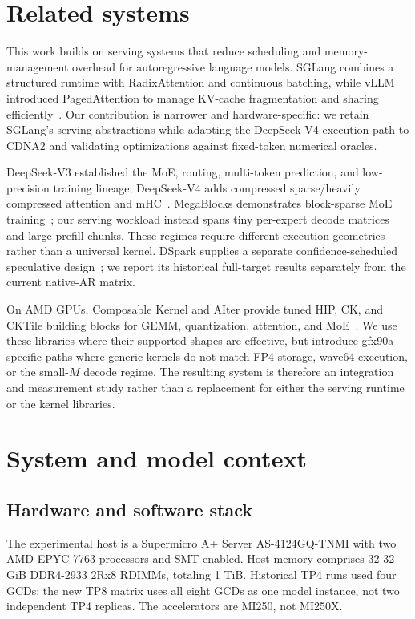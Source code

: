 \documentclass[sigplan,10pt]{acmart}
\begin{document}
\section{Related systems}

This work builds on serving systems that reduce scheduling and memory-management overhead for autoregressive language models. SGLang combines a structured runtime with RadixAttention and continuous batching, while vLLM introduced PagedAttention to manage KV-cache fragmentation and sharing efficiently~\cite{sglang,vllm}. Our contribution is narrower and hardware-specific: we retain SGLang's serving abstractions while adapting the DeepSeek-V4 execution path to CDNA2 and validating optimizations against fixed-token numerical oracles.

DeepSeek-V3 established the MoE, routing, multi-token prediction, and low-precision training lineage; DeepSeek-V4 adds compressed sparse/heavily compressed attention and mHC~\cite{dsv3,dsv4report}. MegaBlocks demonstrates block-sparse MoE training~\cite{megablocks}; our serving workload instead spans tiny per-expert decode matrices and large prefill chunks. These regimes require different execution geometries rather than a universal kernel. DSpark supplies a separate confidence-scheduled speculative design~\cite{dspark}; we report its historical full-target results separately from the current native-AR matrix.

On AMD GPUs, Composable Kernel and AIter provide tuned HIP, CK, and CKTile building blocks for GEMM, quantization, attention, and MoE~\cite{ck,aiter}. We use these libraries where their supported shapes are effective, but introduce gfx90a-specific paths where generic kernels do not match FP4 storage, wave64 execution, or the small-$M$ decode regime. The resulting system is therefore an integration and measurement study rather than a replacement for either the serving runtime or the kernel libraries.

\section{System and model context}

\subsection{Hardware and software stack}

The experimental host is a Supermicro A+ Server AS-4124GQ-TNMI with two AMD EPYC 7763 processors and SMT enabled. Host memory comprises 32 32-GiB DDR4-2933 2Rx8 RDIMMs, totaling 1 TiB. Historical TP4 runs used four GCDs; the new TP8 matrix uses all eight GCDs as one model instance, not two independent TP4 replicas. The accelerators are MI250, not MI250X.
\end{document}
